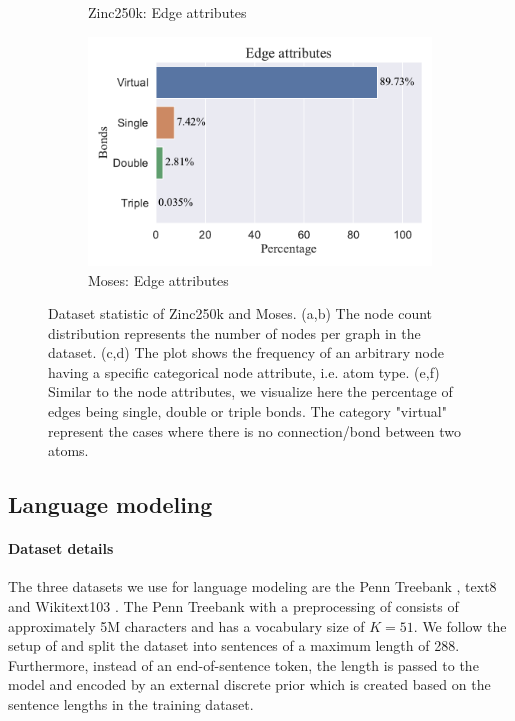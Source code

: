\begin{figure}
\begin{subfigure}{0.49\textwidth}
       \caption{Zinc250k: Edge attributes}
    \end{subfigure}
    \hfill
    \begin{subfigure}{0.49\textwidth}
       \centering
       \includegraphics[width=\linewidth]{figures/experiments_figures/dataset_figures/moses/moses_edge_attributes.pdf}
       \caption{Moses: Edge attributes}
    \end{subfigure}
    \caption[Dataset statistic of Zinc250k and Moses]{Dataset statistic of Zinc250k and Moses. (a,b) The node count distribution represents the number of nodes per graph in the dataset. (c,d) The plot shows the frequency of an arbitrary node having a specific categorical node attribute, i.e. atom type. (e,f) Similar to the node attributes, we visualize here the percentage of edges being single, double or triple bonds. The category "virtual" represent the cases where there is no connection/bond between two atoms. }
    \label{fig:appendix_molecule_generation_dataset_statistics}
\end{figure}
\newpage


\subsection{Language modeling}

\paragraph{Dataset details} The three datasets we use for language modeling are the Penn Treebank \cite{PennTreeBank}, text8 \cite{text8} and Wikitext103 \cite{Wikitext}. The Penn Treebank with a preprocessing of \citet{mikolov2012subword} consists of approximately 5M characters and has a vocabulary size of $K=51$. We follow the setup of \citet{SemiDiscreteNFSequence} and split the dataset into sentences of a maximum length of 288. Furthermore, instead of an end-of-sentence token, the length is passed to the model and encoded by an external discrete prior which is created based on the sentence lengths in the training dataset.

